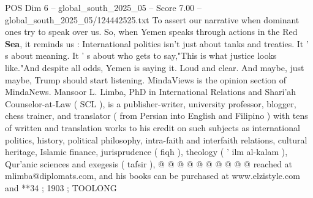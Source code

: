\begin{textsample}{POS Dim 6 – global\_south\_2025\_05 – Score 7.00 – global\_south\_2025\_05/124442525.txt}
To assert our narrative when dominant ones try to speak over us.
So, when Yemen speaks through actions in the Red \textbf{Sea}, it reminds us : International politics isn't just about tanks and treaties.
It ' s about meaning.
It ' s about who gets to say,"This is what justice looks like."And despite all odds, Yemen is saying it.
Loud and clear.
And maybe, just maybe, Trump should start listening.
MindaViews is the opinion section of MindaNews.
Mansoor L.
Limba, PhD in International Relations and Shari'ah Counselor-at-Law ( SCL ), is a publisher-writer, university professor, blogger, chess trainer, and translator ( from Persian into English and Filipino ) with tens of written and translation works to his credit on such subjects as international politics, history, political philosophy, intra-faith and interfaith relations, cultural heritage, Islamic finance, jurisprudence ( fiqh ), theology ( ' ilm al-kalam ), Qur'anic sciences and exegesis ( tafsir ), @ @ @ @ @ @ @ @ @ @ reached at mlimba@diplomats.com, and his books can be purchased at www.elzistyle.com and **34 ; 1903 ; TOOLONG

\end{textsample}
